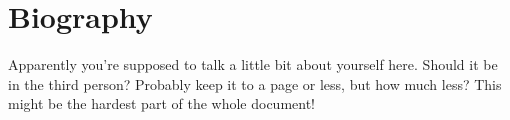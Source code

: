 \chapter{Biography}
Apparently you're supposed to talk a little bit about yourself here. Should it
be in the third person? Probably keep it to a page or less, but how much less?
This might be the hardest part of the whole document!